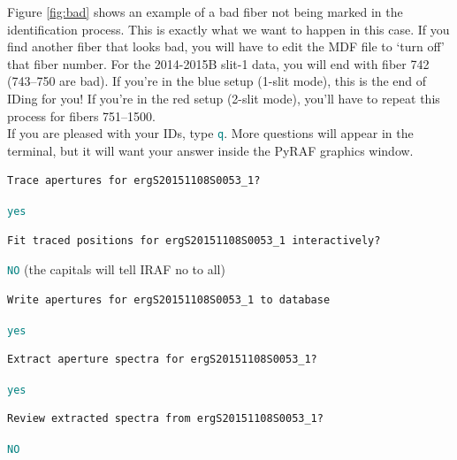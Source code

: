 \documentclass[12pt]{report}
\newcommand{\ty}[1]{\textcolor{teal}{\texttt{#1}}}
\begin{document}
\begin{enumerate}
Figure \ref{fig:bad} shows an example of a bad fiber not being marked in the identification process. This is exactly what we want to happen in this case. If you find another fiber that looks bad, you will have to edit the MDF file to `turn off' that fiber number. For the 2014-2015B slit-1 data, you will end with fiber 742 (743--750 are bad). If you're in the blue setup (1-slit mode), this is the end of IDing for you! If you're in the red setup (2-slit mode), you'll have to repeat this process for fibers 751--1500. \\


If you are pleased with your IDs, type \ty{q}. More questions will appear in the terminal, but it will want your answer inside the PyRAF graphics window.

\begin{verbatim}
Trace apertures for ergS20151108S0053_1? 
\end{verbatim}

\ty{yes}

\begin{verbatim}
Fit traced positions for ergS20151108S0053_1 interactively?
\end{verbatim}

\ty{NO} (the capitals will tell IRAF no to all)

\begin{verbatim}
Write apertures for ergS20151108S0053_1 to database
\end{verbatim}

\ty{yes}

\begin{verbatim}
Extract aperture spectra for ergS20151108S0053_1?
\end{verbatim}

\ty{yes}

\begin{verbatim}
Review extracted spectra from ergS20151108S0053_1?
\end{verbatim}

\ty{NO}

\end{enumerate}
\end{document}
